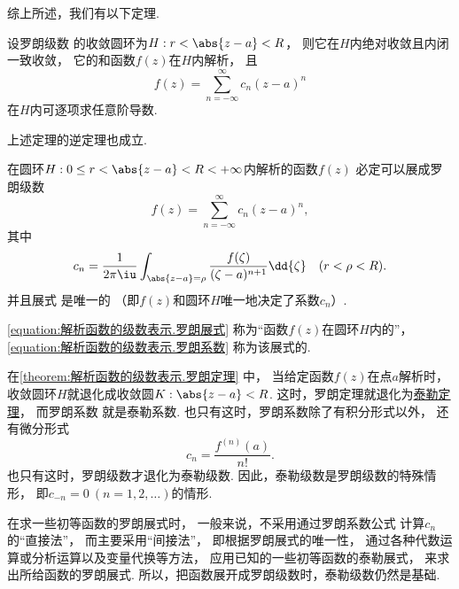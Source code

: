 综上所述，我们有以下定理.
\begin{theorem}
设罗朗级数  的收敛圆环为\(H: r < \abs{z-a} < R\)，
则它在\(H\)内绝对收敛且内闭一致收敛，
它的和函数\(f(z)\)在\(H\)内解析，
且\[
	f(z) = \sum_{n=-\infty}^\infty c_n (z-a)^n
\]在\(H\)内可逐项求任意阶导数.
\end{theorem}

上述定理的逆定理也成立.
\begin{theorem}[罗朗定理]\label{theorem:解析函数的级数表示.罗朗定理}
在圆环\(H: 0 \leq r < \abs{z-a} < R < +\infty\)内解析的函数\(f(z)\)
必定可以展成罗朗级数\begin{equation}\label{equation:解析函数的级数表示.罗朗展式}
	f(z) = \sum_{n=-\infty}^\infty c_n (z-a)^n,
\end{equation}
其中\begin{equation}\label{equation:解析函数的级数表示.罗朗系数}
	c_n = \frac{1}{2\pi\iu} \int_{\abs{z-a}=\rho} \frac{f(\zeta)}{(\zeta-a)^{n+1}} \dd{\zeta}
	\quad(r<\rho<R).
\end{equation}
并且展式  是唯一的
（即\(f(z)\)和圆环\(H\)唯一地决定了系数\(c_n\)）.
\end{theorem}
\cref{equation:解析函数的级数表示.罗朗展式}
称为“函数\(f(z)\)在圆环\(H\)内的”，
\cref{equation:解析函数的级数表示.罗朗系数}
称为该展式的.

在\cref{theorem:解析函数的级数表示.罗朗定理} 中，
当给定函数\(f(z)\)在点\(a\)解析时，
收敛圆环\(H\)就退化成收敛圆\(K: \abs{z-a}<R\).
这时，罗朗定理就退化为\hyperref[theorem:解析函数的级数表示.泰勒定理]{泰勒定理}，
而罗朗系数  就是泰勒系数.
也只有这时，罗朗系数除了有积分形式以外，
还有微分形式\[
	c_n = \frac{f^{(n)}(a)}{n!}.
\]
也只有这时，罗朗级数才退化为泰勒级数.
因此，泰勒级数是罗朗级数的特殊情形，
即\(c_{-n} = 0\ (n=1,2,\dotsc)\)的情形.

在求一些初等函数的罗朗展式时，
一般来说，不采用通过罗朗系数公式  计算\(c_n\)的“直接法”，
而主要采用“间接法”，
即根据罗朗展式的唯一性，
通过各种代数运算或分析运算以及变量代换等方法，
应用已知的一些初等函数的泰勒展式，
来求出所给函数的罗朗展式.
所以，把函数展开成罗朗级数时，泰勒级数仍然是基础.

